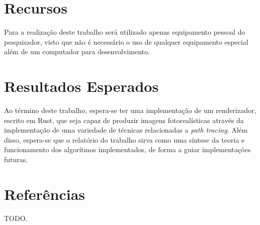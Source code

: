\documentclass[12pt]{article}
\newcommand{\todo}[1]{\textsf{\color{red}#1}}
\begin{document}
\section{Recursos}

Para a realização deste trabalho será utilizado apenas equipamento pessoal do pesquisador, visto que não é necessário o uso de qualquer equipamento especial além de um computador para desenvolvimento.

\section{Resultados Esperados}

Ao término deste trabalho, espera-se ter uma implementação de um renderizador, escrito em Rust, que seja capaz de produzir imagens fotorealísticas através da implementação de uma variedade de técnicas relacionadas a \emph{path tracing}. Além disso, espera-se que o relatório do trabalho sirva como uma síntese da teoria e funcionamento dos algorítmos implementados, de forma a guiar implementações futuras.

\section{Referências}

\todo{TODO.}
\end{document}
